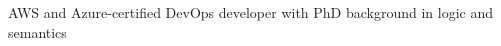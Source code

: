 	\textcolor{highlight2}{AWS and Azure-certified DevOps developer with PhD background in logic and semantics}